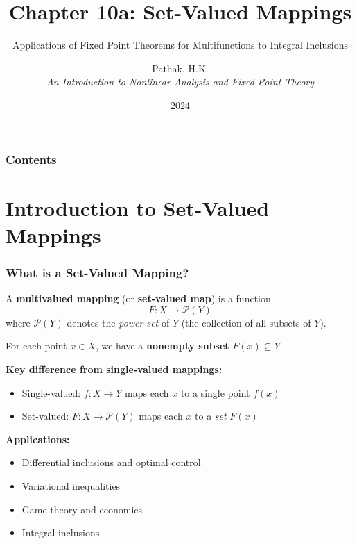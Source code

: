 \documentclass[aspectratio=169,10pt]{beamer}
\title[Chapter 10a: Set-Valued Mappings]{Chapter 10a: Set-Valued Mappings}
\subtitle{Applications of Fixed Point Theorems for Multifunctions to Integral Inclusions}
\author{Pathak, H.K. \\ \textit{An Introduction to Nonlinear Analysis and Fixed Point Theory}}
\institute{Pathak's Textbook, 2018}
\date{2024}
\begin{document}
\frame{\titlepage}


\begin{frame}
\frametitle{Contents}
\tableofcontents
\end{frame}


\section{Introduction to Set-Valued Mappings}

\begin{frame}
\frametitle{What is a Set-Valued Mapping?}

\begin{definition}
A \textbf{multivalued mapping} (or \textbf{set-valued map}) is a function
\[
F: X \to \mathcal{P}(Y)
\]
where $\mathcal{P}(Y)$ denotes the \textit{power set} of $Y$ (the collection of all subsets of $Y$).

For each point $x \in X$, we have a \textbf{nonempty subset} $F(x) \subseteq Y$.
\end{definition}

\vspace{0.5cm}

\textbf{Key difference from single-valued mappings:}
\begin{itemize}
    \item Single-valued: $f: X \to Y$ maps each $x$ to a single point $f(x)$
    \item Set-valued: $F: X \to \mathcal{P}(Y)$ maps each $x$ to a \textit{set} $F(x)$
\end{itemize}

\vspace{0.5cm}

\textbf{Applications:}
\begin{itemize}
    \item Differential inclusions and optimal control
    \item Variational inequalities
    \item Game theory and economics
    \item Integral inclusions
\end{itemize}

\end{frame}
\end{document}
